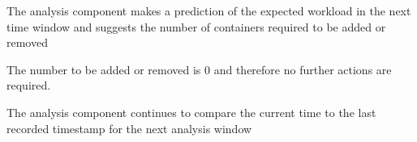 \begin{usecase}
{	\item The analysis component makes a prediction of the expected workload in the next time window and suggests the number of containers required to be added or removed
	\item The number to be added or removed is 0 and therefore no further actions are required.
	\item The analysis component continues to compare the current time to the last recorded timestamp for the next analysis window}
 \end{usecase}
 
